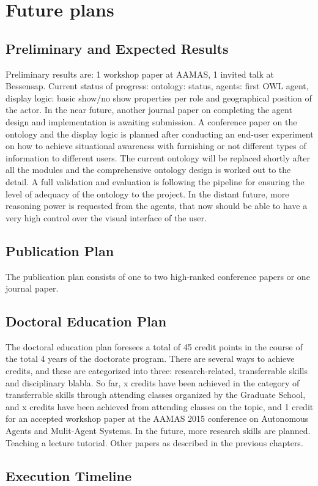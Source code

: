 \section{Future plans}
\subsection{Preliminary and Expected Results}

Preliminary results are: 1 workshop paper at AAMAS, 1 invited talk at Bessensap. 
Current status of progress: ontology: status, agents: first OWL agent, display logic: basic show/no show properties per role and geographical position of the actor. 
In the near future, another journal paper on completing the agent design and implementation is awaiting submission. A conference paper on the ontology and the display logic is planned after conducting an end-user experiment on how to achieve situational awareness with furnishing or not different types of information to different users. The current ontology will be replaced shortly after all the modules and the comprehensive ontology design is worked out to the detail. A full validation and evaluation is following the pipeline for ensuring the level of adequacy of the ontology to the project.
In the distant future, more reasoning power is requested from the agents, that now should be able to have a very high control over the visual interface of the user. 

\subsection{Publication Plan}

The publication plan consists of one to two high-ranked conference papers or one journal paper. 

\subsection{Doctoral Education Plan}
The doctoral education plan foresees a total of 45 credit points in the course of the total 4 years of the doctorate program. There are several ways to achieve credits, and these are categorized into three: research-related, transferrable skills and disciplinary blabla. So far, x credits have been achieved in the category of transferrable skills through attending classes organized by the Graduate School, and x credits have been achieved from attending classes on the topic, and 1 credit for an accepted workshop paper at the AAMAS 2015 conference on Autonomous Agents and Mulit-Agent Systems.
In the future, more research skills are planned.
Teaching a lecture tutorial.
Other papers as described in the previous chapters.

  
\subsection{Execution Timeline}  
  